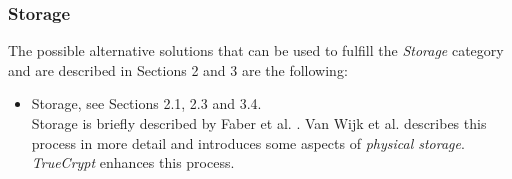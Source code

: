\documentclass{sig-alternate-br}
\begin{document}
\subsubsection{Storage}
The possible alternative solutions that can be used to fulfill the \textit{Storage} category and are described in Sections 2 and 3 are the following:
\begin{itemize}
	\item Storage, see Sections 2.1, 2.3 and 3.4.\\
		Storage is briefly described by Faber et al. \cite{en2011phishing}. Van Wijk et al. \cite{wijk2009achter} describes this process in more detail and introduces some aspects of \textit{physical storage}. \textit{TrueCrypt} \cite{miao2010research} enhances this process.
\end{itemize}
\end{document}
